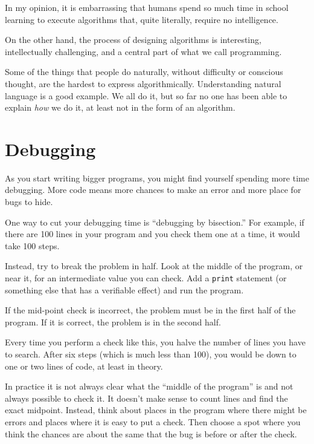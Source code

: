 \documentclass[10pt]{book}
\begin{document}
In my opinion, it is embarrassing that humans spend so much time in
school learning to execute algorithms that, quite literally, require
no intelligence.

On the other hand, the process of designing algorithms is interesting,
intellectually challenging, and a central part of what we call
programming.

Some of the things that people do naturally, without difficulty or
conscious thought, are the hardest to express algorithmically.
Understanding natural language is a good example.  We all do it, but
so far no one has been able to explain {\em how} we do it, at least
not in the form of an algorithm.


\section{Debugging}

As you start writing bigger programs, you might find yourself
spending more time debugging.  More code means more chances to
make an error and more place for bugs to hide.


One way to cut your debugging time is ``debugging by bisection.''
For example, if there are 100 lines in your program and you
check them one at a time, it would take 100 steps.

Instead, try to break the problem in half.  Look at the middle
of the program, or near it, for an intermediate value you
can check.  Add a {\tt print} statement (or something else
that has a verifiable effect) and run the program.

If the mid-point check is incorrect, the problem must be in the
first half of the program.  If it is correct, the problem is
in the second half.

Every time you perform a check like this, you halve the number
of lines you have to search.  After six steps (which is much
less than 100), you would be down to one or two lines of code,
at least in theory.

In practice it is not always clear what
the ``middle of the program'' is and not always possible to
check it.  It doesn't make sense to count lines and find the
exact midpoint.  Instead, think about places
in the program where there might be errors and places where it
is easy to put a check.  Then choose a spot where you
think the chances are about the same that the bug is before
or after the check.
\end{document}
